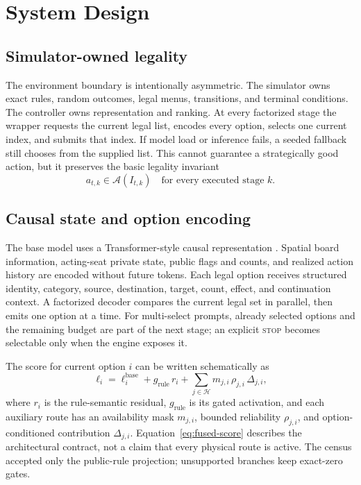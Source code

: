 \section{System Design}

\subsection{Simulator-owned legality}

The environment boundary is intentionally asymmetric. The simulator owns exact
rules, random outcomes, legal menus, transitions, and terminal conditions. The
controller owns representation and ranking. At every factorized stage the
wrapper requests the current legal list, encodes every option, selects one
current index, and submits that index. If model load or inference fails, a
seeded fallback still chooses from the supplied list. This cannot guarantee a
strategically good action, but it preserves the basic legality invariant
\begin{equation}
  a_{t,k}\in\mathcal{A}(I_{t,k}) \quad \text{for every executed stage }k.
\end{equation}

\subsection{Causal state and option encoding}

The base model uses a Transformer-style causal representation
\cite{vaswani2017attention}. Spatial board information, acting-seat private
state, public flags and counts, and realized action history are encoded without
future tokens. Each legal option receives structured identity, category,
source, destination, target, count, effect, and continuation context. A
factorized decoder compares the current legal set in parallel, then emits one
option at a time. For multi-select prompts, already selected options and the
remaining budget are part of the next stage; an explicit \textsc{stop} becomes
selectable only when the engine exposes it.

The score for current option $i$ can be written schematically as
\begin{equation}
  \ell_i = \ell_i^{\mathrm{base}}
    + g_{\mathrm{rule}}\,r_i
    + \sum_{j\in\mathcal{H}} m_{j,i}\,\rho_{j,i}\,\Delta_{j,i},
  \label{eq:fused-score}
\end{equation}
where $r_i$ is the rule-semantic residual, $g_{\mathrm{rule}}$ is its gated
activation, and each auxiliary route has an availability mask $m_{j,i}$,
bounded reliability $\rho_{j,i}$, and option-conditioned contribution
$\Delta_{j,i}$. Equation~\eqref{eq:fused-score} describes the architectural
contract, not a claim that every physical route is active. The census accepted
only the public-rule projection; unsupported branches keep exact-zero gates.

